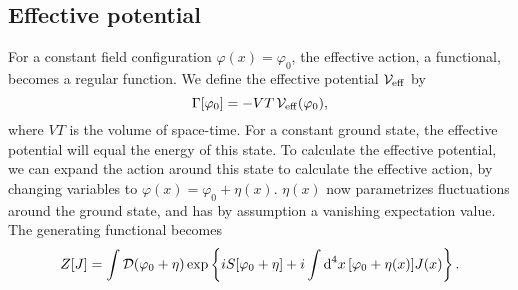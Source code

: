 \subsection{Effective potential}

For a constant field configuration $\varphi(x) = \varphi_0$, the effective action, a functional, becomes a regular function.
We define the effective potential $\mathcal{V}_{\mathrm{eff}}$ by
%
\begin{equation}
    \label{definition effective potential}
    \Gamma[\varphi_0] = - V T \, \mathcal{V}_{\mathrm{eff}}(\varphi_0),
\end{equation}
%
where $VT$ is the volume of space-time.
For a constant ground state, the effective potential will equal the energy of this state.
To calculate the effective potential, we can expand the action around this state to calculate the effective action,
by changing variables to $\varphi(x) = \varphi_0 + \eta(x)$.
$\eta(x)$ now parametrizes fluctuations around the ground state, and has by assumption a vanishing expectation value.
The generating functional becomes
%
\begin{align}
    Z[J] 
    = \int \mathcal D (\varphi_0 + \eta) \, 
    \text{exp} \left\{ i S[\varphi_0 + \eta] + i \int \text{d}^4 x\, [\varphi_0 + \eta(x)] J(x)  \right\}.
\end{align}

